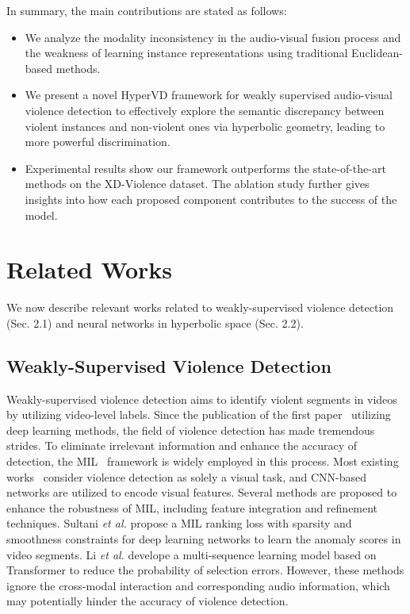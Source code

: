 \documentclass[sigconf]{acmart}
\newcommand{\etal}{{\emph{et al. }}}
\begin{document}
In summary, the main contributions are stated as follows:
\begin{itemize}[leftmargin=*]
\item[]We analyze the modality inconsistency in the audio-visual fusion process and the weakness of learning instance representations using traditional Euclidean-based methods.
\item[]We present a novel HyperVD framework for weakly supervised audio-visual violence detection to effectively explore the semantic discrepancy between violent instances and non-violent ones via hyperbolic geometry, leading to more powerful discrimination.
\item[]Experimental results show our framework outperforms the state-of-the-art methods on the XD-Violence dataset. The ablation study further gives insights into how each proposed component contributes to the success of the model.
\end{itemize}



\section{Related Works}
We now describe relevant works related to weakly-supervised violence detection (Sec. 2.1) and neural networks in hyperbolic space (Sec. 2.2).
\subsection{Weakly-Supervised Violence Detection}
Weakly-supervised violence detection aims to identify violent segments in videos by utilizing video-level labels. Since the publication of the first paper~\cite{Ding2014ViolenceDI} utilizing deep learning methods, the field of violence detection has made tremendous strides. To eliminate irrelevant information and enhance the accuracy of detection, the MIL~\cite{maron1997framework} framework is widely employed in this process. Most existing works~\cite{RendnSegador2023CrimeNetNS, bermejo2011violence, deniz2014fast, feng2021mist, peixoto2019toward, ristea2021self, c:8, zhang2019temporal, zhang2016new} consider violence detection as solely a visual task, and CNN-based networks are utilized to encode visual features. Several methods are proposed to enhance the robustness of MIL, including feature integration and refinement techniques. Sultani \etal \cite{c:7} propose a MIL ranking loss with sparsity and smoothness constraints for deep learning networks to learn the anomaly scores in video segments. Li \etal \cite{c:9} develope a multi-sequence learning model based on Transformer \cite{Vaswani2017AttentionIA} to reduce the probability of selection errors.  
However, these methods ignore the cross-modal interaction and corresponding audio information, which may potentially hinder the accuracy of violence detection.
\end{document}
